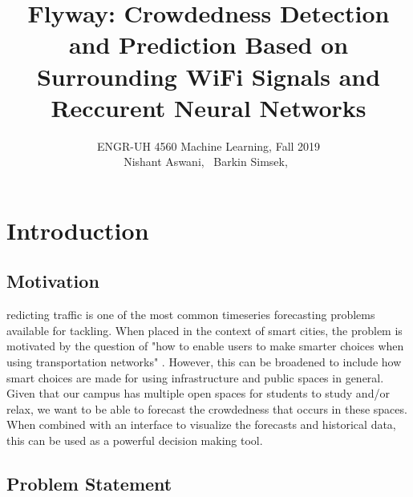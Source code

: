\documentclass[journal, 12pt]{IEEEtran}
\begin{document}
{}
\setcounter{page}{1}

\title{\Large{Flyway: Crowdedness Detection and Prediction Based on Surrounding WiFi Signals and Reccurent Neural Networks}}

\author{ ENGR-UH 4560 Machine Learning, Fall 2019\\
\medskip
Nishant Aswani,~ \;\;
Barkin Simsek,~}%


%
{}

\maketitle




\section{Introduction}
\subsection{Motivation}
\lowercase{redicting} traffic is one of the most common timeseries forecasting problems available for tackling. When placed in the context of smart cities, the problem is motivated by the question of "how to enable users to make smarter choices when using transportation networks" \cite{lv2014traffic}. However, this can be broadened to include how smart choices are made for using infrastructure and public spaces in general. \\

\noindent Given that our campus has multiple open spaces for students to study and/or relax, we want to be able to forecast the crowdedness that occurs in these spaces. When combined with an interface to visualize the forecasts and historical data, this can be used as a powerful decision making tool.

\subsection{Problem Statement}
\end{document}
